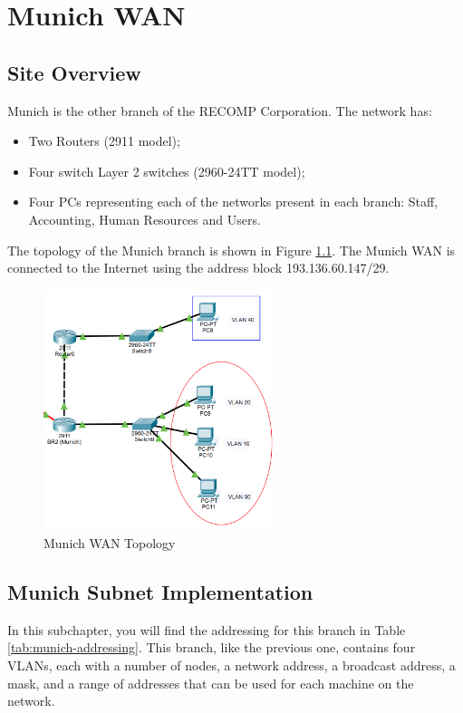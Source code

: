 \chapter{Munich WAN}

\section{Site Overview}
Munich is the other branch of the RECOMP Corporation. The network has:
\begin{itemize}
    \item Two Routers (2911 model);
    \item Four switch Layer 2 switches (2960-24TT model);
    \item Four PCs representing each of the networks present in each branch: Staff, Accounting, Human Resources and Users.
\end{itemize}

The topology of the Munich branch is shown in Figure \ref{fig:munichtopology}. The Munich \ac{WAN} is connected to the Internet using the address block 193.136.60.147/29.

\begin{figure}[!htb]
\centering
\includegraphics[width=0.6\textwidth]{figures/munich_topology.png}
\caption{\label{fig:munichtopology}Munich WAN Topology}
\end{figure}




\section{Munich Subnet Implementation}

In this subchapter, you will find the addressing for this branch in Table \ref{tab:munich-addressing}. This branch, like the previous one, contains four VLANs, each with a number of nodes, a network address, a broadcast address, a mask, and a range of addresses that can be used for each machine on the network.

